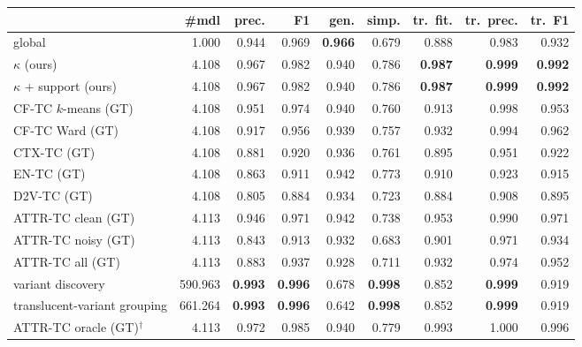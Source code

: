 \begin{tabular}{lrrrrrrrr}
\toprule
 & \#mdl & prec. & F1 & gen. & simp. & tr.\ fit. & tr.\ prec. & tr.\ F1 \\
\midrule
global & 1.000 & 0.944 & 0.969 & \textbf{0.966} & 0.679 & 0.888 & 0.983 & 0.932 \\
$\kappa$ (ours) & 4.108 & 0.967 & 0.982 & 0.940 & 0.786 & \textbf{0.987} & \textbf{0.999} & \textbf{0.992} \\
$\kappa$ + support (ours) & 4.108 & 0.967 & 0.982 & 0.940 & 0.786 & \textbf{0.987} & \textbf{0.999} & \textbf{0.992} \\
CF-TC $k$-means (GT) & 4.108 & 0.951 & 0.974 & 0.940 & 0.760 & 0.913 & 0.998 & 0.953 \\
CF-TC Ward (GT) & 4.108 & 0.917 & 0.956 & 0.939 & 0.757 & 0.932 & 0.994 & 0.962 \\
CTX-TC (GT) & 4.108 & 0.881 & 0.920 & 0.936 & 0.761 & 0.895 & 0.951 & 0.922 \\
EN-TC (GT) & 4.108 & 0.863 & 0.911 & 0.942 & 0.773 & 0.910 & 0.923 & 0.915 \\
D2V-TC (GT) & 4.108 & 0.805 & 0.884 & 0.934 & 0.723 & 0.884 & 0.908 & 0.895 \\
ATTR-TC clean (GT) & 4.113 & 0.946 & 0.971 & 0.942 & 0.738 & 0.953 & 0.990 & 0.971 \\
ATTR-TC noisy (GT) & 4.113 & 0.843 & 0.913 & 0.932 & 0.683 & 0.901 & 0.971 & 0.934 \\
ATTR-TC all (GT) & 4.113 & 0.883 & 0.937 & 0.928 & 0.711 & 0.932 & 0.974 & 0.952 \\
variant discovery & 590.963 & \textbf{0.993} & \textbf{0.996} & 0.678 & \textbf{0.998} & 0.852 & \textbf{0.999} & 0.919 \\
translucent-variant grouping & 661.264 & \textbf{0.993} & \textbf{0.996} & 0.642 & \textbf{0.998} & 0.852 & \textbf{0.999} & 0.919 \\
ATTR-TC oracle (GT)$^{\dagger}$ & 4.113 & 0.972 & 0.985 & 0.940 & 0.779 & 0.993 & 1.000 & 0.996 \\
\bottomrule
\end{tabular}
